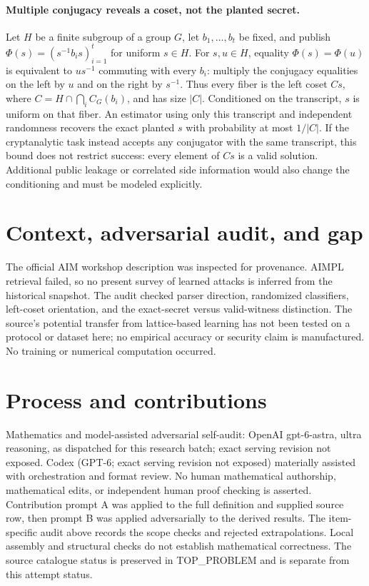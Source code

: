 \documentclass[11pt]{article}
\begin{document}
\paragraph{Multiple conjugacy reveals a coset, not the planted secret.}
Let $H$ be a finite subgroup of a group $G$, let $b_1,\ldots,b_t$ be fixed,
and publish $\Phi(s)=(s^{-1}b_i s)_{i=1}^t$ for uniform $s\in H$.
For $s,u\in H$, equality $\Phi(s)=\Phi(u)$ is equivalent to
$us^{-1}$ commuting with every $b_i$: multiply the conjugacy equalities on
the left by $u$ and on the right by $s^{-1}$. Thus every fiber is the left
coset $Cs$, where $C=H\cap\bigcap_i C_G(b_i)$, and has size $|C|$.
Conditioned on the transcript, $s$ is uniform on that fiber. An estimator
using only this transcript and independent randomness recovers the exact
planted $s$ with probability at most $1/|C|$. If the cryptanalytic task instead
accepts any conjugator with the same transcript, this bound does not restrict
success: every element of $Cs$ is a valid solution. Additional public leakage
or correlated side information would also change the conditioning and must
be modeled explicitly.

\section{Context, adversarial audit, and gap}
The official AIM workshop description was inspected for provenance. AIMPL
retrieval failed, so no present survey of learned attacks is inferred from
the historical snapshot. The audit checked parser direction, randomized
classifiers, left-coset orientation, and the exact-secret versus valid-witness
distinction. The source's potential transfer from lattice-based learning has
not been tested on a protocol or dataset here; no empirical accuracy or
security claim is manufactured. No training or numerical computation occurred.

\section{Process and contributions}
Mathematics and model-assisted adversarial self-audit: OpenAI gpt-6-astra, ultra reasoning, as dispatched for this research batch; exact serving revision not exposed. Codex (GPT-6; exact serving revision not exposed) materially assisted with orchestration and format review. No human mathematical authorship, mathematical edits, or independent human proof checking is asserted.
Contribution prompt A was applied to the full definition and supplied source row, then prompt B was applied adversarially to the derived results. The item-specific audit above records the scope checks and rejected extrapolations. Local assembly and structural checks do not establish mathematical correctness. The source catalogue status is preserved in TOP\_PROBLEM and is separate from this attempt status.
\end{document}
